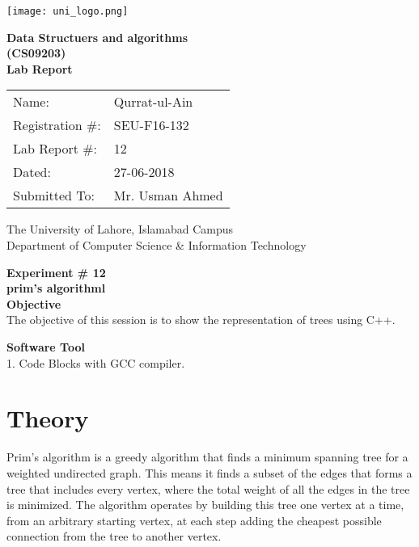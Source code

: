 \documentclass[11pt]{article}            %
\begin{document}
\begin{titlepage}
    \centering
  \vfill
    \texttt{[image: uni\_logo.png]} \\ 
	\vskip2cm
    {\bfseries\Large
	Data Structuers and algorithms \\ (CS09203)\\
	
	\vskip2cm
	Lab Report 
	 
	\vskip2cm
	}    

\begin{center}
\begin{tabular}{ l l  } 

Name: & Qurrat-ul-Ain \\ 
Registration \#: & SEU-F16-132 \\ 
Lab Report \#: & 12 \\ 
 Dated:& 27-06-2018\\ 
Submitted To:& Mr. Usman Ahmed\\ 

\end{tabular}
\end{center}
    \vfill
    The University of Lahore, Islamabad Campus\\
Department of Computer Science \& Information Technology
\end{titlepage}


    
    {\bfseries\Large
\centering
	Experiment \# 12 \\

prim's algorithml \\
	
	}    
 \vskip1cm
 \textbf {Objective}\\ The objective of this session is to show the representation of trees using C++. 
 
 \textbf {Software Tool} \\
 1. Code Blocks with GCC compiler.

\section{Theory }              

 Prim's algorithm is a greedy algorithm that finds a minimum spanning tree for a weighted undirected graph. This means it finds a subset of the edges that forms a tree that includes every vertex, where the total weight of all the edges in the tree is minimized. The algorithm operates by building this tree one vertex at a time, from an arbitrary starting vertex, at each step adding the cheapest possible connection from the tree to another vertex.
\end{document}
